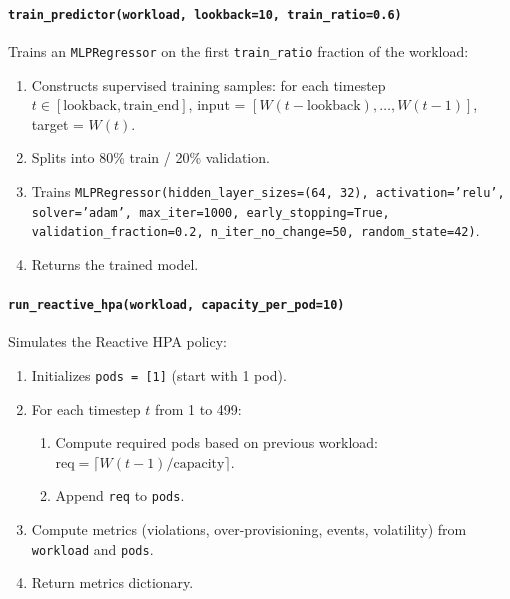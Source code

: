 \paragraph{\texttt{train\_predictor(workload, lookback=10, train\_ratio=0.6)}}
Trains an \texttt{MLPRegressor} on the first \texttt{train\_ratio} fraction of the workload:
\begin{enumerate}
  \item Constructs supervised training samples: for each timestep $t \in [\text{lookback}, \text{train\_end}]$, input = $[W(t-\text{lookback}), \ldots, W(t-1)]$, target = $W(t)$.
  \item Splits into 80\% train / 20\% validation.
  \item Trains \texttt{MLPRegressor(hidden\_layer\_sizes=(64, 32), activation='relu', solver='adam', max\_iter=1000, early\_stopping=True, validation\_fraction=0.2, n\_iter\_no\_change=50, random\_state=42)}.
  \item Returns the trained model.
\end{enumerate}

\paragraph{\texttt{run\_reactive\_hpa(workload, capacity\_per\_pod=10)}}
Simulates the Reactive HPA policy:
\begin{enumerate}
  \item Initializes \texttt{pods = [1]} (start with 1 pod).
  \item For each timestep $t$ from 1 to 499:
  \begin{enumerate}
    \item Compute required pods based on previous workload: $\text{req} = \lceil W(t-1) / \text{capacity} \rceil$.
    \item Append \texttt{req} to \texttt{pods}.
  \end{enumerate}
  \item Compute metrics (violations, over-provisioning, events, volatility) from \texttt{workload} and \texttt{pods}.
  \item Return metrics dictionary.
\end{enumerate}

